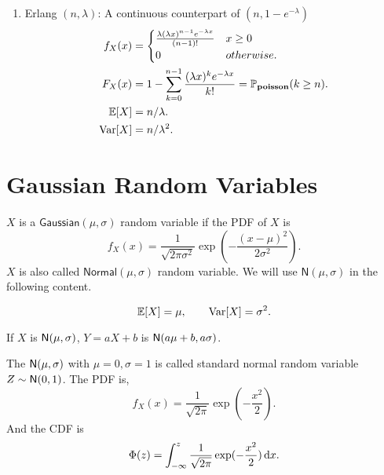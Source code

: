 \begin{enumerate}
{    }
    \item Erlang $(n,\lambda)$: A continuous counterpart of  $(n,1-e^{-\lambda})${
        \begin{align*}
            f_X(x)
            &= {
                \begin{cases}
                    \frac{\lambda (\lambda x)^{n-1}e^{-\lambda x}}{(n-1)!} & x\geq 0 \\
                    0      & otherwise.
                \end{cases}
            } \\
            F_X(x)
            &= 1-\sum_{k=0}^{n-1}\frac{(\lambda x)^k e^{-\lambda x}}{k!} = \mathbb{P}_{\mathbf{poisson}}(k\geq n). \\
            \E{X}
            &= n/\lambda. \\
            \Var[X]
            &= n/\lambda^2.
        \end{align*}
    }
\end{enumerate}


\section{Gaussian Random Variables}

\begin{definition}
    $X$ is a $\mathsf{Gaussian}(\mu, \sigma)$ random variable if the \textnormal{PDF} of $X$ is
    \[f_X(x)=\frac{1}{\sqrt{2\pi\sigma^2}}\exp(-\frac{(x-\mu)^2}{2\sigma^2}).\]
    $X$ is also called $\mathsf{Normal}(\mu,\sigma)$ random variable. We will use $\mathsf{N}(\mu, \sigma)$ in the following content.
\end{definition}

\begin{theorem}
    \[\E{X} = \mu, \qquad \Var[X] = \sigma^2.\]
\end{theorem}

\begin{theorem}
    If $X$ is $\mathsf{N}(\mu,\sigma)$, $Y=aX+b$ is $\mathsf{N}(a\mu+b,a\sigma)$.
\end{theorem}

\begin{definition}
    The $\mathsf{N}(\mu,\sigma)$ with $\mu=0, \sigma=1$ is called standard normal random variable $Z\sim\mathsf{N}(0,1)$. The PDF is,
    \[f_X(x)=\frac{1}{\sqrt{2\pi}}\exp(-\frac{x^2}{2}).\]
    And the CDF is
    \[\Phi(z)=\int_{-\infty}^{z}\frac{1}{\sqrt{2\pi}}\exp(-\frac{x^2}{2})\mathop{}\!\mathrm{d} x.\]
\end{definition}

